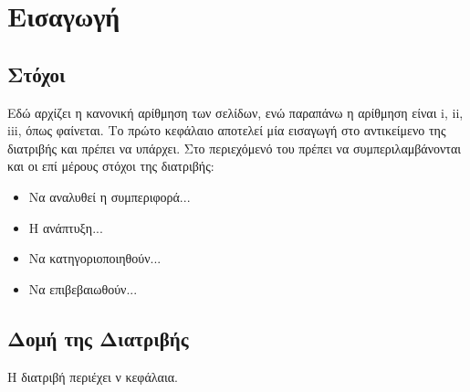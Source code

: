 \chapter{Εισαγωγή}
\label{ch:Introduction}


\section{Στόχοι}
\label{sec:Objectives}
Εδώ αρχίζει η κανονική αρίθμηση των σελίδων, ενώ παραπάνω η αρίθμηση είναι i, ii, iii, όπως φαίνεται.
Το πρώτο κεφάλαιο αποτελεί μία εισαγωγή στο αντικείμενο της διατριβής και πρέπει να υπάρχει.
Στο περιεχόμενό του πρέπει να συμπεριλαμβάνονται και οι επί μέρους στόχοι της διατριβής:
\begin{itemize}
	\item Να αναλυθεί η συμπεριφορά...
	\item Η ανάπτυξη...
	\item Να κατηγοριοποιηθούν...
	\item Να επιβεβαιωθούν...
\end{itemize}


\section{Δομή της Διατριβής}
\label{sec:Structure}
Η διατριβή περιέχει ν κεφάλαια.
